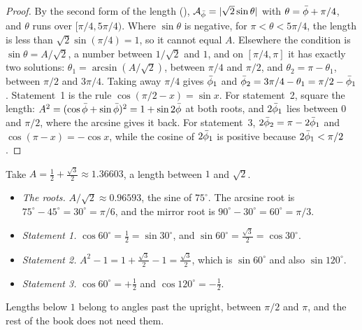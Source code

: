 \begin{proof}
By the second form of the length (), $\mathcal{A}_{\bar{\phi}} = |\sqrt{2}\sin\theta|$ with $\theta = \bar{\phi} + \pi/4$, and $\theta$ runs over $[\pi/4, 5\pi/4)$. Where $\sin\theta$ is negative, for $\pi < \theta < 5\pi/4$, the length is less than $\sqrt{2}\sin(\pi/4) = 1$, so it cannot equal $A$. Elsewhere the condition is $\sin\theta = A/\sqrt{2}$, a number between $1/\sqrt{2}$ and $1$, and on $[\pi/4, \pi]$ it has exactly two solutions: $\theta_1 = \arcsin(A/\sqrt{2})$, between $\pi/4$ and $\pi/2$, and $\theta_2 = \pi - \theta_1$, between $\pi/2$ and $3\pi/4$. Taking away $\pi/4$ gives $\bar{\phi}_1$ and $\bar{\phi}_2 = 3\pi/4 - \theta_1 = \pi/2 - \bar{\phi}_1$. Statement~1 is the rule $\cos(\pi/2 - x) = \sin x$. For statement~2, square the length: $A^2 = (\cos\bar{\phi} + \sin\bar{\phi})^2 = 1 + \sin 2\bar{\phi}$ at both roots, and $2\bar{\phi}_1$ lies between $0$ and $\pi/2$, where the arcsine gives it back. For statement~3, $2\bar{\phi}_2 = \pi - 2\bar{\phi}_1$ and $\cos(\pi - x) = -\cos x$, while the cosine of $2\bar{\phi}_1$ is positive because $2\bar{\phi}_1 < \pi/2$.
\end{proof}

\begin{workedexample}
Take $A = \tfrac{1}{2} + \tfrac{\sqrt{3}}{2} \approx 1.36603$, a length between $1$ and $\sqrt{2}$.
\begin{itemize}
  \item \emph{The roots.} $A/\sqrt{2} \approx 0.96593$, the sine of $75^\circ$. The arcsine root is $75^\circ - 45^\circ = 30^\circ = \pi/6$, and the mirror root is $90^\circ - 30^\circ = 60^\circ = \pi/3$.
  \item \emph{Statement 1.} $\cos 60^\circ = \tfrac{1}{2} = \sin 30^\circ$, and $\sin 60^\circ = \tfrac{\sqrt{3}}{2} = \cos 30^\circ$.
  \item \emph{Statement 2.} $A^2 - 1 = 1 + \tfrac{\sqrt{3}}{2} - 1 = \tfrac{\sqrt{3}}{2}$, which is $\sin 60^\circ$ and also $\sin 120^\circ$.
  \item \emph{Statement 3.} $\cos 60^\circ = +\tfrac{1}{2}$ and $\cos 120^\circ = -\tfrac{1}{2}$.
\end{itemize}
Lengths below $1$ belong to angles past the upright, between $\pi/2$ and $\pi$, and the rest of the book does not need them.
\end{workedexample}


